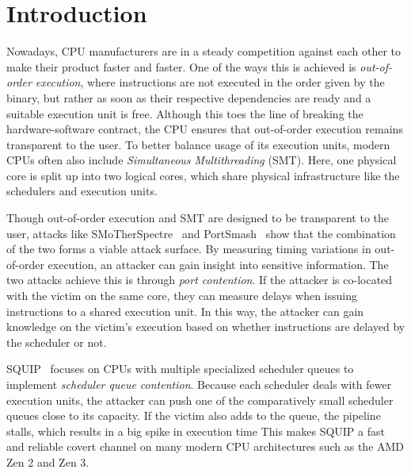 \documentclass[11pt,
  titlepage=false,
]{scrreprt}
\begin{document}
\clearpage


\chapter{Introduction}
\label{ch:introduction}

Nowadays, CPU manufacturers are in a steady competition against each other to make their product faster and faster.
One of the ways this is achieved is \textit{out-of-order execution}, where instructions are not executed in the order given by the binary,
but rather as soon as their respective dependencies are ready and a suitable execution unit is free.
Although this toes the line of breaking the hardware-software contract, the CPU ensures that out-of-order execution remains transparent to the user.
To better balance usage of its execution units, modern CPUs often also include \textit{Simultaneous Multithreading} (SMT).
Here, one physical core is split up into two logical cores, which share physical infrastructure like the schedulers and execution units.

Though out-of-order execution and SMT are designed to be transparent to the user, attacks like
SMoTherSpectre~\cite{Bhattacharyya2019} and PortSmash~\cite{Aldaya2019port} show that the combination of the two forms a viable attack surface.
By measuring timing variations in out-of-order execution, an attacker can gain insight into sensitive information.
The two attacks achieve this is through \textit{port contention}.
If the attacker is co-located with the victim on the same core, they can measure delays when issuing instructions to a shared execution unit.
In this way, the attacker can gain knowledge on the victim's execution based on whether instructions are delayed by the scheduler or not.

SQUIP~\cite{squip} focuses on CPUs with multiple specialized scheduler queues to implement \textit{scheduler queue contention}.
Because each scheduler deals with fewer execution units, the attacker can push one of the comparatively small scheduler queues close to its capacity.
If the victim also adds to the queue, the pipeline stalls, which results in a big spike in execution time
This makes SQUIP a fast and reliable covert channel on many modern CPU architectures such as the AMD Zen 2 and Zen 3.
\end{document}
